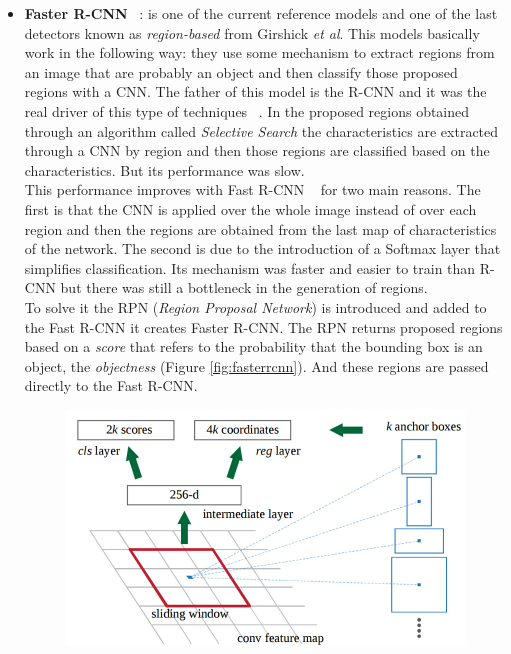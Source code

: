 \documentclass{bmvc2k}
\def\etal{\emph{et al}\bmvaOneDot}
\begin{document}
\begin{itemize}
\item \textbf{Faster R-CNN} ~\cite{ren2015faster}: is one of the current reference models and one of the last detectors known as  \textit{region-based} from Girshick \etal{}. This models basically work in the following way: they use some mechanism to extract regions from an image that are probably an object and then classify those proposed regions with a CNN. The father of this model is the R-CNN and it was the real driver of this type of techniques ~\cite{girshick2014rich}. In the proposed regions obtained through an algorithm called \textit{Selective Search} the characteristics are extracted through a CNN by region and then those regions are classified based on the characteristics. But its performance was slow.\\
This performance improves with Fast R-CNN ~\cite{girshick2015fast} for two main reasons. The first is that the CNN is applied over the whole image instead of over each region and then the regions are obtained from the last map of characteristics of the network. The second is due to the introduction of a Softmax layer that simplifies classification. Its mechanism was faster and easier to train than R-CNN but there was still a bottleneck in the generation of regions.\\
To solve it the RPN (\textit{Region Proposal Network}) is introduced and added to the Fast R-CNN it creates Faster R-CNN. The RPN returns proposed regions based on a \textit{score} that refers to the probability that the bounding box is an object, the \textit{objectness} (Figure \ref{fig:fasterrcnn}). And these regions are passed directly to the Fast R-CNN.\\
\begin{figure}[h!]
\begin{center}
\includegraphics[scale=0.25]{faster_rcnn.png}

\end{center}
\end{figure}
\end{itemize}
\end{document}

